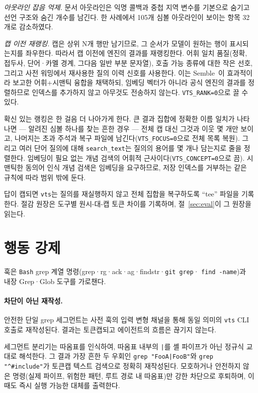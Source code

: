 \documentclass[11pt]{article}
\begin{document}
\emph{아웃라인 잡음 억제.} 문서 아웃라인은 익명 콜백과 중첩 지역 변수를 기본으로 숨기고 선언
구조와 숨긴 개수를 남긴다. 한 사례에서 105개 심볼 아웃라인이 보이는 항목 32개로 감소하였다.

\emph{캡 이전 재랭킹.} 캡은 상위 N개 행만 남기므로, 그 순서가 모델이 원하는 행이 표시되는지를
좌우한다. 따라서 캡 이전에 엔진의 결과를 재랭킹한다. 어휘 일치 품질(정확, 접두사, 단어·카멜
경계, 그다음 일반 부분 문자열), 호출 가능 종류에 대한 작은 선호, 그리고 사전 워밍에서 재사용한
질의 이력 신호를 사용한다. 이는 Semble~\cite{semble-hn}이 효과적이라 보고한 어휘+시맨틱 융합을
채택하되, 임베딩 벡터가 아니라 공식 엔진의 결과를 정렬하므로 인덱스를 추가하지 않고 아무것도
전송하지 않는다. \texttt{VTS\_RANK=0}으로 끌 수 있다.

확신 있는 랭킹은 한 걸음 더 나아가게 한다. 큰 결과 집합에 정확한 이름 일치가 나타나면 ---
알려진 심볼 하나를 찾는 흔한 경우 --- 전체 캡 대신 그것과 이웃 몇 개만 보이고, 나머지는 초과
주석과 복구 파일에 남긴다(\texttt{VTS\_FOCUS=0}으로 전체 목록 복원). 그리고 여러 단어 질의에
대해 \texttt{search\_text}는 질의의 용어를 몇 개나 담는지로 줄을 정렬한다. 임베딩이 필요 없는
개념 검색의 어휘적 근사이다(\texttt{VTS\_CONCEPT=0}으로 끔). 시맨틱한 동의어 인식 개념 검색은
임베딩을 요구하므로, 저장 인덱스를 거부하는 같은 규칙에 따라 범위 밖에 둔다.

답이 캡되면 \texttt{vts}는 질의를 재실행하지 않고 전체 집합을 복구하도록 ``tee'' 파일을
기록한다. 절감 원장은 도구별 원시-대-캡 토큰 차이를 기록하며, 절~\ref{sec:eval}이 그 원장을
읽는다.

\section{행동 강제}
\label{sec:enforce}

훅은 \texttt{Bash} grep 계열 명령(grep·rg·ack·ag·findstr·\texttt{git grep}·
\texttt{find -name})과 내장 Grep·Glob 도구를 가로챈다.

\paragraph{차단이 아닌 재작성.}
안전한 단일 grep 세그먼트는 사전 훅의 입력 변형 채널을 통해 동일 의미의 \texttt{vts} CLI
호출로 재작성된다. 결과는 토큰캡되고 에이전트의 흐름은 끊기지 않는다.

세그먼트 분리기는 따옴표를 인식하여, 따옴표 내부의 \texttt{|}를 셸 파이프가 아닌 정규식 교대로
해석한다. 그 결과 가장 흔한 두 우회인 \texttt{grep "FooA|FooB"}와
\texttt{grep "\^{}\#include"}가 토큰캡 텍스트 검색으로 정확히 재작성된다. 모호하거나 안전하지
않은 명령(실제 파이프, 위험한 패턴, 루트 경로 내 따옴표)만 강한 차단으로 후퇴하며, 이때도 즉시
실행 가능한 대체를 출력한다.
\end{document}
